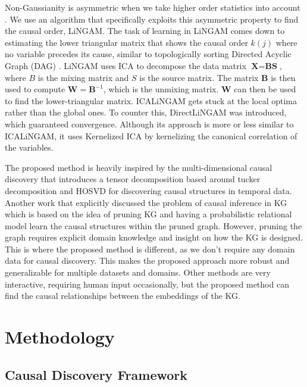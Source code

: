 \documentclass{article}
\begin{document}
Non-Gaussianity is asymmetric when we take higher order statistics into account \cite{Dodge2001,Dodge2009}. We use an algorithm that specifically exploits this asymmetric property to find the causal order, LiNGAM. The task of learning in LiNGAM comes down to estimating the lower triangular matrix that shows the causal order $k(j)$ where no variable precedes its cause,  similar to topologically sorting Directed Acyclic Graph (DAG) \cite{pang2015topological}.  LiNGAM uses ICA  to decompose the data matrix $\textbf{X}  = \textbf{BS}$, where $B$ is the mixing matrix and $S$ is the source matrix. The matrix $\textbf{B}$ is then used to compute $\textbf{W} = \textbf{B}^{-1}$, which is the unmixing matrix. $\textbf{W}$ can then be used to find the lower-triangular matrix. ICALiNGAM gets stuck at the local optima rather than the global ones. To counter this, DirectLiNGAM was introduced, which guaranteed convergence. Although its approach is more or less similar to ICALiNGAM, it uses Kernelized ICA \cite{bach2002kernel} by kernelizing the canonical correlation \cite{akaho2006kernel} of the variables.


The proposed method is heavily inspired by the  multi-dimensional causal discovery \cite{schaechtle2013multi} that introduces a tensor decomposition based around tucker decomposition and HOSVD \cite{wang2017tensor} for discovering causal structures in temporal data.
Another work that explicitly discussed the problem of causal inference in KG \cite{semex_2019_4}  which is based on the idea of pruning KG and having a probabilistic relational model learn the causal structures within the pruned graph. 
However, pruning the graph requires explicit domain knowledge and insight on how the KG is designed.  This is where the proposed method is different, as we don't require any domain data for causal discovery. This makes the proposed approach more robust and generalizable for multiple datasets and domains. Other methods are very interactive, requiring human input occasionally, but the proposed method can find the causal relationships between the embeddings of the KG.



\section{Methodology} \label{methodology}
\subsection{Causal Discovery Framework}
\end{document}
